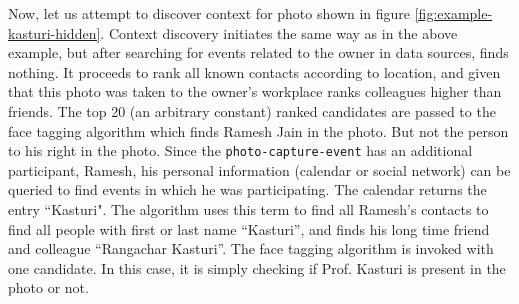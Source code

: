 Now, let us attempt to discover context for photo shown in figure \ref{fig:example-kasturi-hidden}. Context discovery initiates the same way as in the above example, but after searching for events related to the owner in data sources, finds nothing. It proceeds to rank all known contacts according to location, and given that this photo was taken to the owner's workplace ranks colleagues higher than friends. The top 20 (an arbitrary constant) ranked candidates are passed to the face tagging algorithm which finds Ramesh Jain in the photo. But not the person to his right in the photo. Since the \texttt{photo-capture-event} has an additional participant, Ramesh, his personal information (calendar or social network) can be queried to find events in which he was participating. The calendar returns the entry ``Kasturi". The algorithm uses this term to find all Ramesh's contacts to find all people with first or last name ``Kasturi'', and finds his long time friend and colleague ``Rangachar Kasturi''. The face tagging algorithm is invoked with one candidate. In this case, it is simply checking if Prof. Kasturi is present in the photo or not.

